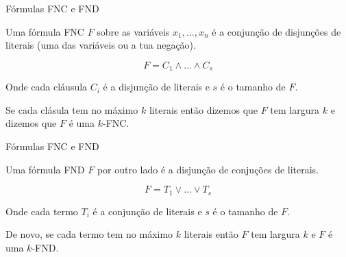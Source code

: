 \documentclass[landscape]{beamer}
\begin{document}

\begin{frame}

\titlepage

\end{frame}


\begin{frame}{Fórmulas FNC e FND}

Uma fórmula FNC $F$ sobre as variáveis $x_{1}, \dots, x_{n}$ é a conjunção de disjunções de literais (uma das variáveis ou a tua negação).

\begin{equation*}
	F = C_{1} \land \dots \land C_{s}
\end{equation*}

Onde cada cláusula $C_{i}$ é a disjunção de literais e $s$ é o tamanho de $F$.

Se cada clásula tem no máximo $k$ literais então dizemos que $F$ tem largura $k$ e dizemos que $F$ é uma $k$-FNC.

\end{frame}


\begin{frame}{Fórmulas FNC e FND}

Uma fórmula FND $F$ por outro lado é a disjunção de conjuções de literais.

\begin{equation*}
	F = T_{1} \lor \dots \lor T_{s}
\end{equation*}

Onde cada termo $T_{i}$ é a conjunção de literais e $s$ é o tamanho de $F$.

De novo, se cada termo tem no máximo $k$ literais então $F$ tem largura $k$ e $F$ é uma $k$-FND.

\end{frame}

\end{document}
